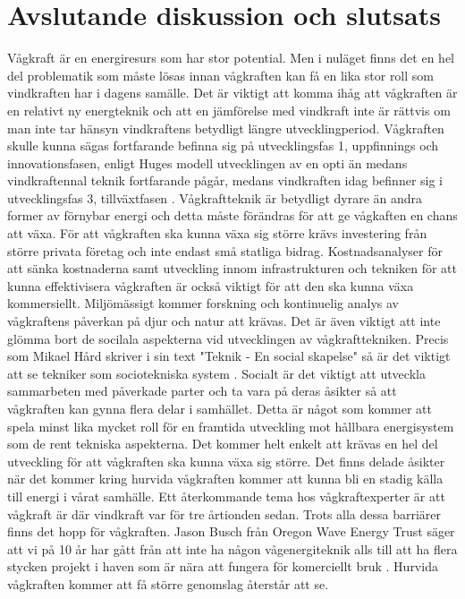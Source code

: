\documentclass[10pt,a4paper,oneside]{article}
\begin{document}
\section{Avslutande diskussion och slutsats}
Vågkraft är en energiresurs som har stor potential. Men i nuläget finns det en hel del problematik som måste lösas innan vågkraften kan få en lika stor roll som vindkraften har i dagens samälle. 
Det är viktigt att komma ihåg att vågkraften är en relativt ny energteknik och att en jämförelse med vindkraft inte är rättvis om man inte tar hänsyn vindkraftens betydligt längre utvecklingperiod. Vågkraften skulle kunna sägas fortfarande befinna sig på utvecklingsfas 1, uppfinnings och innovationsfasen, enligt Huges modell utvecklingen av en opti än medans vindkraftennal teknik fortfarande pågår, medans vindkraften idag befinner sig i utvecklingsfas 3, tillväxtfasen \cite{Summerton}. Vågkraftteknik är betydligt dyrare än andra former av förnybar energi och detta måste förändras för att ge vågkaften en chans att växa. För att vågkraften ska kunna växa sig större krävs investering från större privata företag och inte endast små statliga bidrag. Kostnadsanalyser för att sänka kostnaderna samt utveckling innom infrastrukturen och tekniken för att kunna effektivisera vågkraften är också viktigt för att den ska kunna växa kommersiellt. Miljömässigt kommer forskning och kontinuelig analys av vågkraftens påverkan på djur och natur att krävas. Det är även viktigt att inte glömma bort de socilala aspekterna vid utvecklingen av vågkrafttekniken. Precis som Mikael Hård skriver i sin text "Teknik - En social skapelse" så är det viktigt att se tekniker som sociotekniska system \cite{Hård}. Socialt är det viktigt att utveckla sammarbeten med påverkade parter och ta vara på deras åsikter så att vågkraften kan gynna flera delar i samhället. Detta är något som kommer att spela minst lika mycket roll för en framtida utveckling mot hållbara energisystem som de rent tekniska aspekterna. Det kommer helt enkelt att krävas en hel del utveckling för att vågkraften ska kunna växa sig större. Det finns delade åsikter när det kommer kring hurvida vågkraften kommer att kunna bli en stadig källa till energi i vårat samhälle. Ett återkommande tema hos vågkraftexperter är att vågkraft är där vindkraft var för tre årtionden sedan. Trots alla dessa barriärer finns det hopp för vågkraften. Jason Busch från Oregon Wave Energy Trust säger att vi på 10 år har gått från att inte ha någon vågenergiteknik alls till att ha flera stycken projekt i haven som är nära att fungera för komerciellt bruk \cite{IRENA}. Hurvida vågkraften kommer att få större genomslag återstår att se. 
\newpage
\end{document}
